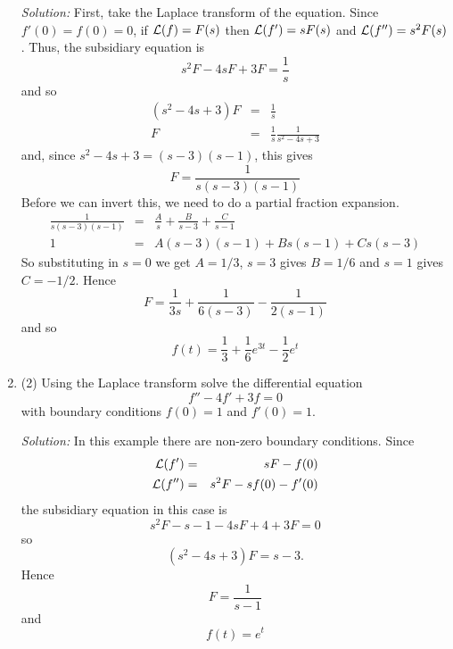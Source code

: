\documentclass[12pt]{article}
\begin{document}
\begin{enumerate}
\noindent\textit{Solution:} First, take the Laplace transform of the
equation. Since $f'(0)=f(0)=0$, if ${\cal L}(f)=F(s)$ then ${\cal
L}(f')=sF(s)$ and ${\cal L}(f'')=s^2F(s)$. Thus, the subsidiary
equation is
\begin{equation}
s^2F-4sF+3F=\frac{1}{s}
\end{equation}
and so
\begin{eqnarray}
(s^2-4s+3)F&=&\frac{1}{s}\nonumber\\
F&=&\frac{1}{s}\frac{1}{s^2-4s+3}
\end{eqnarray}
and, since $s^2-4s+3=(s-3)(s-1)$, this gives
\begin{equation}
F=\frac{1}{s(s-3)(s-1)}
\end{equation}
Before we can invert this, we need to do a partial fraction expansion.
\begin{eqnarray}
\frac{1}{s(s-3)(s-1)}&=&\frac{A}{s}+\frac{B}{s-3}+\frac{C}{s-1}\nonumber\\
1&=&A(s-3)(s-1)+Bs(s-1)+Cs(s-3)
\end{eqnarray}
So substituting in $s=0$ we get $A=1/3$, $s=3$ gives $B=1/6$ and $s=1$ gives $C=-1/2$. Hence
\begin{equation}
F=\frac{1}{3s}+\frac{1}{6(s-3)}-\frac{1}{2(s-1)}
\end{equation}
and so
\begin{equation}
f(t)=\frac{1}{3}+\frac{1}{6}e^{3t}-\frac{1}{2}e^t
\end{equation}

\item (2)
Using the Laplace transform solve the differential equation
\begin{equation}
f''-4f'+3f=0
\end{equation}
with boundary conditions $f(0)=1$ and $f'(0)=1$.

\noindent\textit{Solution:}  In this example there are non-zero boundary conditions. Since
\begin{eqnarray}
{\cal L}(f')&=&sF-f(0)\\
{\cal L}(f'')&=&s^2F-sf(0)-f'(0)
\end{eqnarray}
the subsidiary equation in this case is
\begin{equation}
s^2F-s-1-4sF+4+3F=0
\end{equation}
so
\begin{equation}
(s^2-4s+3)F=s-3.
\end{equation}
Hence
\begin{equation}
F=\frac{1}{s-1}
\end{equation}
and
\begin{equation}
f(t)=e^t
\end{equation}




\end{enumerate}
\end{document}
